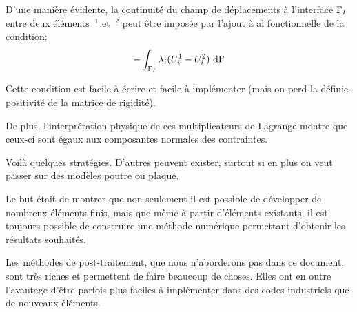 \begin{description}
	D'une manière évidente, la continuité du champ de déplacements
	à l'interface $\Gamma_I$ entre deux éléments $~^1$ et $~^2$ peut être
	imposée par l'ajout à al fonctionnelle de la condition:
	\begin{equation}  -\dint_{\li} \lambda_i(U_i^1-U_i^2)\ \dd\Gamma \end{equation}

	Cette condition est facile à écrire et facile à implémenter (mais on perd la
	définie-positivité de la matrice de rigidité).
	
	De plus, l'interprétation physique de ces multiplicateurs de Lagrange montre
	que ceux-ci sont égaux aux composantes normales des contraintes.
\end{description}
\medskip
Voilà quelques stratégies. D'autres peuvent exister, surtout si en plus on veut passer
sur des modèles poutre ou plaque.

Le but était de montrer que non seulement il est possible de développer de nombreux
éléments finis, mais que même à partir d'éléments existants, il est toujours
possible de construire une méthode numérique permettant d'obtenir les résultats
souhaités.

Les méthodes de post-traitement, que nous n'aborderons pas dans ce document,
sont très riches et permettent de faire beaucoup de choses.
Elles ont en outre l'avantage d'être parfois plus faciles à implémenter dans des
codes industriels que de nouveaux éléments.

\medskip

